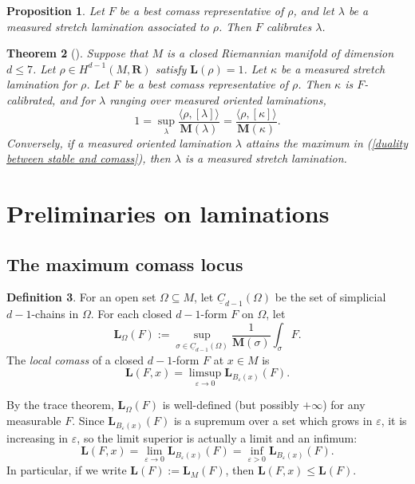 \documentclass[reqno,11pt]{amsart}
\newcommand{\RR}{\mathbf{R}}
\newcommand{\Chain}{\underline C}
\newcommand{\Mass}{\mathbf M}
\newcommand{\Comass}{\mathbf L}
\newcommand{\dfn}[1]{\emph{#1}\index{#1}}
\newtheorem{theorem}{Theorem}[section]
\newtheorem{proposition}[theorem]{Proposition}
\theoremstyle{definition}
\newtheorem{definition}[theorem]{Definition}
\numberwithin{equation}{section}
\begin{document}
\begin{proposition}\label{MCL contains Thurston}
Let $F$ be a best comass representative of $\rho$, and let $\lambda$ be a measured stretch lamination associated to $\rho$.
Then $F$ calibrates $\lambda$.
\end{proposition}

\begin{theorem}[{\cite[Theorem B]{BackusBest1}}]\label{lams are calibrated}\label{calibrated means measured stretch}
Suppose that $M$ is a closed Riemannian manifold of dimension $d \leq 7$.
Let $\rho \in H^{d - 1}(M, \RR)$ satisfy $\Comass(\rho) = 1$.
Let $\kappa$ be a measured stretch lamination for $\rho$.
Let $F$ be a best comass representative of $\rho$.
Then $\kappa$ is $F$-calibrated, and for $\lambda$ ranging over measured oriented laminations,
\begin{equation}\label{duality between stable and comass}
1 = \sup_\lambda \frac{\langle \rho, [\lambda]\rangle}{\Mass(\lambda)} = \frac{\langle \rho, [\kappa]\rangle}{\Mass(\kappa)}.
\end{equation}
Conversely, if a measured oriented lamination $\lambda$ attains the maximum in (\ref{duality between stable and comass}), then $\lambda$ is a measured stretch lamination.
\end{theorem}


\section{Preliminaries on laminations}
\subsection{The maximum comass locus}
\begin{definition}
For an open set $\Omega \subseteq M$, let $\Chain_{d - 1}(\Omega)$ be the set of simplicial $d - 1$-chains in $\Omega$.
For each closed $d - 1$-form $F$ on $\Omega$, let
$$\Comass_\Omega(F) := \sup_{\sigma \in \Chain_{d - 1}(\Omega)} \frac{1}{\Mass(\sigma)} \int_\sigma F.$$
The \dfn{local comass} of a closed $d - 1$-form $F$ at $x \in M$ is 
$$\Comass(F, x) = \limsup_{\varepsilon \to 0} \Comass_{B_\varepsilon(x)}(F).$$
\end{definition}

By the trace theorem, $\Comass_\Omega(F)$ is well-defined (but possibly $+\infty$) for any measurable $F$.
Since $\Comass_{B_\varepsilon(x)}(F)$ is a supremum over a set which grows in $\varepsilon$, it is increasing in $\varepsilon$, so the limit superior is actually a limit and an infimum:
$$\Comass(F, x) = \lim_{\varepsilon \to 0} \Comass_{B_\varepsilon(x)}(F) = \inf_{\varepsilon > 0} \Comass_{B_\varepsilon(x)}(F).$$
In particular, if we write $\Comass(F) := \Comass_M(F)$, then $\Comass(F, x) \leq \Comass(F)$.
\end{document}
